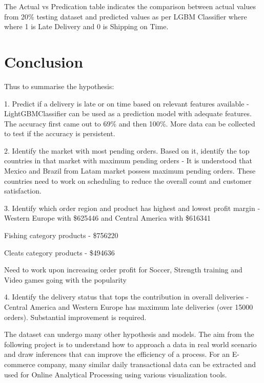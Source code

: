 \documentclass[journal,twoside,web]{ieeecolor}
\begin{document}
The Actual vs Predication table indicates the comparison between actual values from 20{\%} testing dataset and predicted values as per LGBM Classifier where where 1 is Late Delivery and 0 is Shipping on Time.

\section{Conclusion}

Thus to summarise the hypothesis:

1.	Predict if a delivery is late or on time based on relevant features available - 
LightGBMClassifier can be used as a prediction model with adequate features. The accuracy first came out to 69{\%} and then 100{\%}. More data can be collected to test if the accuracy is persistent. 

2.	Identify the market with most pending orders. Based on it, identify the top countries in that market with maximum pending orders -
It is understood that Mexico and Brazil from Latam market possess maximum pending orders. These countries need to work on scheduling to reduce the overall count and customer satisfaction.

3.	Identify which order region and product has highest and lowest profit margin -
Western Europe with {\$}625446 and Central America with {\$}616341

Fishing category products - {\$}756220

Cleats category products - {\$}494636

Need to work upon increasing order profit for Soccer, Strength training and Video games going with the popularity



4.	Identify the delivery status that tops the contribution in overall deliveries  - 
Central America and Western Europe has maximum late deliveries (over 15000 orders). Substantial improvement is required. 

The dataset can undergo many other hypothesis and models. The aim from the following project is to understand how to approach a data in real world scenario and draw inferences that can improve the efficiency of a process. For an E-commerce company, many similar daily transactional data can be extracted and used for Online Analytical Processing using various visualization tools. 
\end{document}
